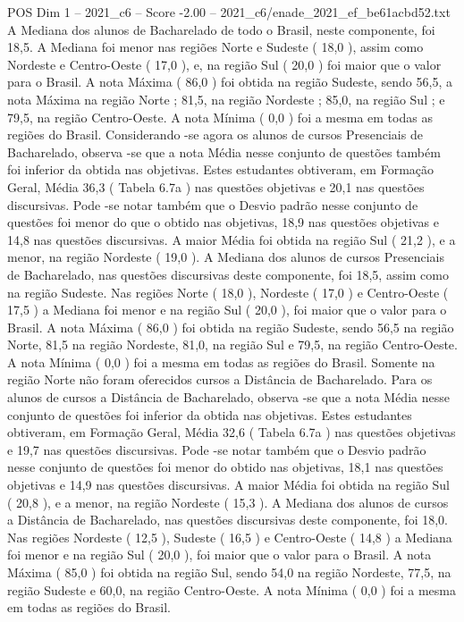 \begin{textsample}{POS Dim 1 – 2021\_c6 – Score -2.00 – 2021\_c6/enade\_2021\_ef\_be61acbd52.txt}
A Mediana dos alunos de Bacharelado de todo o Brasil, neste componente, foi 18,5.
A Mediana foi menor nas regiões Norte e Sudeste ( 18,0 ), assim como Nordeste e Centro-Oeste ( 17,0 ), e, na região Sul ( 20,0 ) foi maior que o valor para o Brasil.
A nota Máxima ( 86,0 ) foi obtida na região Sudeste, sendo 56,5, a nota Máxima na região Norte ; 81,5, na região Nordeste ; 85,0, na região Sul ; e 79,5, na região Centro-Oeste.
A nota Mínima ( 0,0 ) foi a mesma em todas as regiões do Brasil.
Considerando -se agora os alunos de cursos Presenciais de Bacharelado, observa -se que a nota Média nesse conjunto de questões também foi inferior da obtida nas objetivas.
Estes estudantes obtiveram, em Formação Geral, Média 36,3 ( Tabela 6.7a ) nas questões objetivas e 20,1 nas questões discursivas.
Pode -se notar também que o Desvio padrão nesse conjunto de questões foi menor do que o obtido nas objetivas, 18,9 nas questões objetivas e 14,8 nas questões discursivas.
A maior Média foi obtida na região Sul ( 21,2 ), e a menor, na região Nordeste ( 19,0 ).
A Mediana dos alunos de cursos Presenciais de Bacharelado, nas questões discursivas deste componente, foi 18,5, assim como na região Sudeste.
Nas regiões Norte ( 18,0 ), Nordeste ( 17,0 ) e Centro-Oeste ( 17,5 ) a Mediana foi menor e na região Sul ( 20,0 ), foi maior que o valor para o Brasil.
A nota Máxima ( 86,0 ) foi obtida na região Sudeste, sendo 56,5 na região Norte, 81,5 na região Nordeste, 81,0, na região Sul e 79,5, na região Centro-Oeste.
A nota Mínima ( 0,0 ) foi a mesma em todas as regiões do Brasil.
Somente na região Norte não foram oferecidos cursos a Distância de Bacharelado.
Para os alunos de cursos a Distância de Bacharelado, observa -se que a nota Média nesse conjunto de questões foi inferior da obtida nas objetivas.
Estes estudantes obtiveram, em Formação Geral, Média 32,6 ( Tabela 6.7a ) nas questões objetivas e 19,7 nas questões discursivas.
Pode -se notar também que o Desvio padrão nesse conjunto de questões foi menor do obtido nas objetivas, 18,1 nas questões objetivas e 14,9 nas questões discursivas.
A maior Média foi obtida na região Sul ( 20,8 ), e a menor, na região Nordeste ( 15,3 ).
A Mediana dos alunos de cursos a Distância de Bacharelado, nas questões discursivas deste componente, foi 18,0.
Nas regiões Nordeste ( 12,5 ), Sudeste ( 16,5 ) e Centro-Oeste ( 14,8 ) a Mediana foi menor e na região Sul ( 20,0 ), foi maior que o valor para o Brasil.
A nota Máxima ( 85,0 ) foi obtida na região Sul, sendo 54,0 na região Nordeste, 77,5, na região Sudeste e 60,0, na região Centro-Oeste.
A nota Mínima ( 0,0 ) foi a mesma em todas as regiões do Brasil.

\end{textsample}
